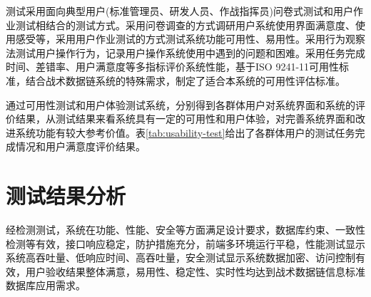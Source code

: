 测试采用面向典型用户(标准管理员、研发人员、作战指挥员)问卷式测试和用户作业测试相结合的测试方式。采用问卷调查的方式调研用户系统使用界面满意度、使用感受等，采用用户作业测试的方式测试系统功能可用性、易用性。采用行为观察法测试用户操作行为，记录用户操作系统使用中遇到的问题和困难。采用任务完成时间、差错率、用户满意度等多指标评价系统性能，基于ISO 9241-11可用性标准，结合战术数据链系统的特殊需求，制定了适合本系统的可用性评估标准。

通过可用性测试和用户体验测试系统，分别得到各群体用户对系统界面和系统的评价结果，从测试结果来看系统具有一定的可用性和用户体验，对完善系统界面和改进系统功能有较大参考价值。表\ref{tab:usability-test}给出了各群体用户的测试任务完成情况和用户满意度评价结果。

\begin{table}[H]
\centering
\caption{可用性与用户体验测试结果}
\label{tab:usability-test}
\end{table}



\section{测试结果分析}

经检测测试，系统在功能、性能、安全等方面满足设计要求，数据库约束、一致性检测等有效，接口响应稳定，防护措施充分，前端多环境运行平稳，性能测试显示系统高吞吐量、低响应时间、高吞吐量，安全测试显示系统数据加密、访问控制有效，用户验收结果整体满意，易用性、稳定性、实时性均达到战术数据链信息标准数据库应用需求。
